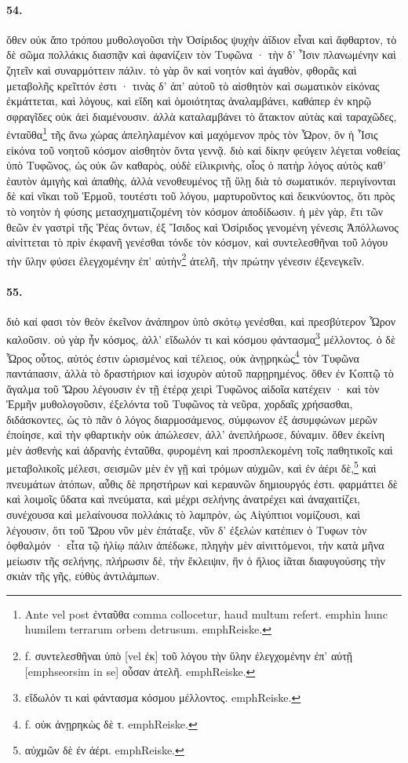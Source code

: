 \documentclass[a4paper, 11pt, oneside, polutonikogreek, german]{article}
\begin{document}
\paragraph{54.}
ὅθεν οὐκ ἄπο τρόπου μυθολογοῦσι τὴν Ὀσίριδος ψυχὴν ἀΐδιον εἶναι καὶ ἄφθαρτον, τὸ δὲ σῶμα πολλάκις διασπᾷν καὶ ἀφανίζειν τὸν Τυφῶνα · τὴν δ' Ἶσιν πλανωμένην καὶ ζητεῖν καὶ συναρμόττειν πάλιν. τὸ γὰρ ὂν καὶ νοητὸν καὶ ἀγαθὸν, φθορᾶς καὶ μεταβολῆς κρεῖττόν ἐστι · τινὰς δ' ἀπ' αὐτοῦ τὸ αἰσθητὸν καὶ σωματικὸν εἰκόνας ἐκμάττεται, καὶ λόγους, καὶ εἴδη καὶ ὁμοιότητας ἀναλαμβάνει, καθάπερ ἐν κηρῷ σφραγῖδες οὐκ ἀεὶ διαμένουσιν. ἀλλὰ καταλαμβάνει τὸ ἄτακτον αὐτὰς καὶ ταραχῶδες, ἐνταῦθα\footnote{Ante vel post ἐνταῦθα comma collocetur, haud multum refert. emph{in hunc humilem terrarum orbem detrusum.} emph{Reiske.}} τῆς ἄνω χώρας ἀπεληλαμένον καὶ μαχόμενον πρὸς τὸν Ὧρον, ὃν ἡ Ἶσις εἰκόνα τοῦ νοητοῦ κόσμον αἰσθητὸν ὄντα γεννᾷ. διὸ καὶ δίκην φεύγειν λέγεται νοθείας ὑπὸ Τυφῶνος, ὡς οὐκ ὢν καθαρὸς, οὐδὲ εἰλικρινὴς, οἷος ὁ πατὴρ λόγος αὐτὸς καθ' ἑαυτὸν ἀμιγὴς καὶ ἀπαθὴς, ἀλλὰ νενοθευμένος τῇ ὕλῃ διὰ τὸ σωματικόν. περιγίνονται δὲ καὶ νῖκαι τοῦ Ἑρμοῦ, τουτέστι τοῦ λόγου, μαρτυροῦντος καὶ δεικνύοντος, ὅτι πρὸς τὸ νοητὸν ἡ φύσης μετασχηματιζομένη τὸν κόσμον ἀποδίδωσιν. ἡ μὲν γὰρ, ἔτι τῶν θεῶν ἐν γαστρὶ τῆς Ῥέας ὄντων, ἐξ Ἴσιδος καὶ Ὀσίριδος γενομένη γένεσις Ἀπόλλωνος αἰνίττεται τὸ πρὶν ἐκφανῆ γενέσθαι τόνδε τὸν κόσμον, καὶ συντελεσθῆναι τοῦ λόγου τὴν ὕλην φύσει ἐλεγχομένην ἐπ' αὐτὴν\footnote{f. συντελεσθῆναι ὑπὸ [vel ἐκ] τοῦ λόγου τὴν ὕλην ἐλεγχομένην ἐπ' αὐτῇ [emph{seorsim in se}] οὖσαν ἀτελῆ. emph{Reiske.}} ἀτελῆ, τὴν πρώτην γένεσιν ἐξενεγκεῖν.

\paragraph{55.}
διὸ καί φασι τὸν θεὸν ἐκεῖνον ἀνάπηρον ὑπὸ σκότῳ γενέσθαι, καὶ πρεσβύτερον Ὧρον καλοῦσιν. οὐ γὰρ ἦν κόσμος, ἀλλ' εἴδωλόν τι καὶ κόσμου φάντασμα\footnote{εἴδωλόν τι καὶ φάντασμα κόσμου μέλλοντος. emph{Reiske.}} μέλλοντος. ὁ δὲ Ὧρος οὗτος, αὐτός ἐστιν ὡρισμένος καὶ τέλειος, οὐκ ἀνῃρηκὼς\footnote{f. οὐκ ἀνῃρηκὼς δὲ τ. emph{Reiske.}} τὸν Τυφῶνα παντάπασιν, ἀλλὰ τὸ δραστήριον καὶ ἰσχυρὸν αὐτοῦ παρῃρημένος. ὅθεν ἐν Κοπτῷ τὸ ἄγαλμα τοῦ Ὥρου λέγουσιν ἐν τῇ ἑτέρᾳ χειρὶ Τυφῶνος αἰδοῖα κατέχειν · καὶ τὸν Ἑρμῆν μυθολογοῦσιν, ἐξελόντα τοῦ Τυφῶνος τὰ νεῦρα, χορδαῖς χρήσασθαι, διδάσκοντες, ὡς τὸ πᾶν ὁ λόγος διαρμοσάμενος, σύμφωνον ἐξ ἀσυμφώνων μερῶν ἐποίησε, καὶ τὴν φθαρτικὴν οὐκ ἀπώλεσεν, ἀλλ' ἀνεπλήρωσε, δύναμιν. ὅθεν ἐκείνη μὲν ἀσθενὴς καὶ ἀδρανὴς ἐνταῦθα, φυρομένη καὶ προσπλεκομένη τοῖς παθητικοῖς καὶ μεταβολικοῖς μέλεσι, σεισμῶν μὲν ἐν γῇ καὶ τρόμων αὐχμῶν, καὶ ἐν ἀέρι δὲ,\footnote{αὐχμῶν δὲ ἐν ἀέρι. emph{Reiske.}} καὶ πνευμάτων ἀτόπων, αὖθις δὲ πρηστήρων καὶ κεραυνῶν δημιουργός ἐστι. φαρμάττει δὲ καὶ λοιμοῖς ὕδατα καὶ πνεύματα, καὶ μέχρι σελήνης ἀνατρέχει καὶ ἀναχαιτίζει, συνέχουσα καὶ μελαίνουσα πολλάκις τὸ λαμπρὸν, ὡς Αἰγύπτιοι νομίζουσι, καὶ λέγουσιν, ὅτι τοῦ Ὥρου νῦν μὲν ἐπάταξε, νῦν δ' ἐξελὼν κατέπιεν ὁ Τυφων τὸν ὀφθαλμόν · εἶτα τῷ ἡλίῳ πάλιν ἀπέδωκε, πληγὴν μὲν αἰνιττόμενοι, τὴν κατὰ μῆνα μείωσιν τῆς σελήνης, πλήρωσιν δὲ, τὴν ἔκλειψιν, ἣν ὁ ἥλιος ἰᾶται διαφυγούσης τὴν σκιὰν τῆς γῆς, εὐθὺς ἀντιλάμπων.
\end{document}
